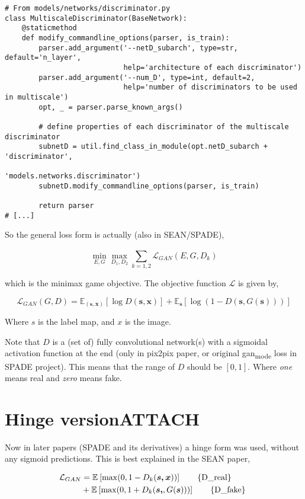 \documentclass{memoir}
\begin{document}
\begin{verbatim}
# From models/networks/discriminator.py
class MultiscaleDiscriminator(BaseNetwork):
    @staticmethod
    def modify_commandline_options(parser, is_train):
        parser.add_argument('--netD_subarch', type=str, default='n_layer',
                            help='architecture of each discriminator')
        parser.add_argument('--num_D', type=int, default=2,
                            help='number of discriminators to be used in multiscale')
        opt, _ = parser.parse_known_args()

        # define properties of each discriminator of the multiscale discriminator
        subnetD = util.find_class_in_module(opt.netD_subarch + 'discriminator',
                                            'models.networks.discriminator')
        subnetD.modify_commandline_options(parser, is_train)

        return parser
# [...]
\end{verbatim}

So the general loss form is actually (also in SEAN/SPADE),

\[
\min_{E,G} \max_{D_1 , D_2} \sum_{k=1,2}^{} \mathcal{ L }_{GAN}(E,G, D_{k})
\]

which is the minimax game objective. The objective function \(\mathcal{L}\) is given by,

\[
\mathcal{L}_{GAN}(G,D) = \mathbb{E}_{\left( \boldsymbol{s,x}\right)} \left[ \log D(\boldsymbol{s,x}) \right] + \mathbb{E}_{\boldsymbol{s}} \left[ \log(1 - D(\boldsymbol{s} , G(\boldsymbol{s}))) \right]
\]

Where \(s\) is the label map, and \(x\) is the image.

Note that \(D\) is a (set of) fully convolutional network(s) with a sigmoidal activation
function at the end (only in pix2pix paper, or original gan\textsubscript{mode} loss in SPADE
project). This means that the range of \(D\) should be \(\left[ 0,1\right]\).
Where \emph{one} means real and \emph{zero} means fake.

\section{Hinge version\hfill{}\textsc{ATTACH}}
\label{sec:org693b1bd}
Now in later papers (SPADE and its derivatives) a hinge form was used, without
any sigmoid predictions. This is best explained in the SEAN paper,

\begin{align}
\mathcal{ L }_{GAN} &= \mathbb{E}_{} \left[ \max(0,1 - D_{k}(\boldsymbol{s,x})) \right] \tag*{\{D\_real\} }\\
 &+ \mathbb{E}_{} \left[ \max(0, 1 + D_{k}(\boldsymbol{s,},G(\boldsymbol{s}))) \right] \tag*{\{D\_fake\} }
\end{align}
\end{document}
